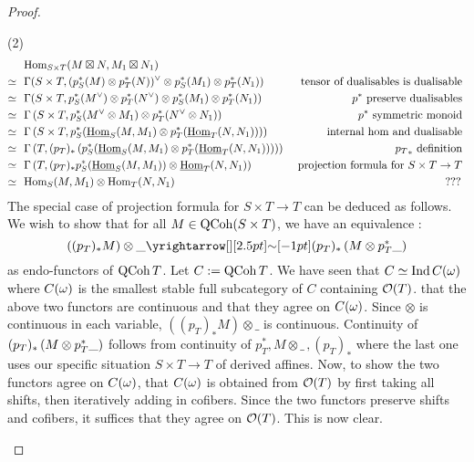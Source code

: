 \documentclass[./main.tex]{subfiles}
\begin{document}
\begin{proof}
\begin{lem}
\begin{proof1}
      (2) \begin{align*}
        &\,\,\,\,\mathrm{Hom}_{S \times T}(M \boxtimes N , M_1 \boxtimes N_1) \\
        \simeq &\,\,\,\, \Gamma(S \times T , 
        (p_S^*(M) \otimes p_T^*(N))^\vee \otimes p_S^*(M_1) \otimes p_T^*(N_1))
        &\text{ tensor of dualisables is dualisable }
        \\
        \simeq &\,\,\,\, \Gamma(S \times T , 
        p_S^*(M^\vee) \otimes p_T^*(N^\vee) \otimes p_S^*(M_1) \otimes p_T^*(N_1))
        &\text{ $p^*$ preserve dualisables }
        \\
        \simeq &\,\,\,\, \Gamma\left(S \times T , 
        p_S^*(M^\vee \otimes M_1) \otimes p_T^*(N^\vee \otimes N_1)\right)
        &\text{ $p^*$ symmetric monoid }
        \\
        \simeq &\,\,\,\, \Gamma\left(S \times T , 
        p_S^*(\underline{\mathrm{Hom}}_S(M , M_1) 
        \otimes p_T^*(\underline{\mathrm{Hom}}_T(N,N_1)))\right)
        &\text{ internal hom and dualisable }
        \\
        \simeq &\,\,\,\, \Gamma\left(T , (p_T)_*\left(
          p_S^*(\underline{\mathrm{Hom}}_S(M , M_1) 
        \otimes p_T^*(\underline{\mathrm{Hom}}_T(N,N_1)))
        \right)\right)
        &\text{ ${p_T}_*$ definition }
        \\
        \simeq &\,\,\,\, \Gamma\left(
          T , (p_T)_* p_S^* (\underline{\mathrm{Hom}}_S(M , M_1))
        \otimes \underline{\mathrm{Hom}}_T(N,N_1)
        \right)
        &\text{ projection formula for $S \times T \to T$ }
        \\
        \simeq &\,\,\,\, \mathrm{Hom}_S(M , M_1) \otimes \mathrm{Hom}_T(N , N_1)
        &\text{ ??? }
      \end{align*}
      The special case of projection formula for $S \times T \to T$
      can be deduced as follows.
      We wish to show that for all $M \in \mathrm{QCoh}(S \times T)$, 
      we have an equivalence : 
      \[
        ((p_T)_* M) \otimes \_ \map{\sim}{} (p_T)_*\brkt{M \otimes p_T^* \_}
      \]
      as endo-functors of $\mathrm{QCoh}\,T$.
      Let $C := \mathrm{QCoh}\,T$. 
      We have seen that $C \simeq \mathrm{Ind}\,C(\omega)$ where
      $C(\omega)$ is the smallest stable full subcategory of $C$ containing
      $\mathcal{O}(T)$.
      that the above two functors are continuous and
      that they agree on $C(\omega)$.
      Since $\otimes$ is continuous in each variable,
      $((p_T)_* M) \otimes \_$ is continuous.
      Continuity of $(p_T)_*\left(M \otimes p_T^* \_\right)$
      follows from continuity of $p_T^*, M \otimes\_ \,, (p_T)_*$
      where the last one uses our specific situation $S \times T \to T$
      of derived affines.
      Now, to show the two functors agree on $C(\omega)$,
       that $C(\omega)$ is obtained from
      $\mathcal{O}(T)$ by first taking all shifts, then iteratively 
      adding in cofibers.
      Since the two functors preserve shifts and cofibers,
      it suffices that they agree on $\mathcal{O}(T)$.
      This is now clear.
    \end{proof1}
  \end{lem}

\end{proof}
\end{document}
